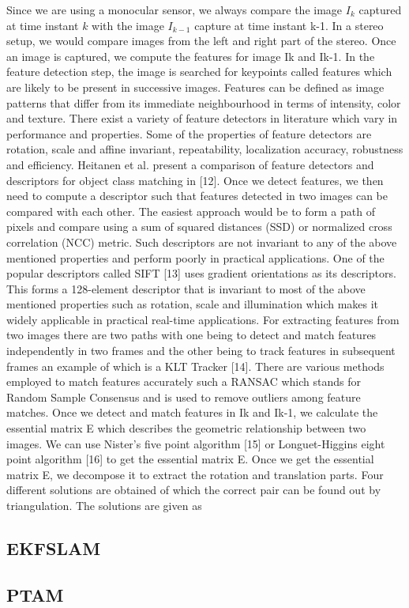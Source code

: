 Since we are using a monocular sensor, we always compare the image $I_k$ captured at time instant $k$ with the image $I_{k-1}$ capture at time instant k-1. In a stereo setup, we would compare images from the left and right part of the stereo. Once an image is captured, we compute the features for image Ik and Ik-1. In the feature detection step, the image is searched for keypoints called features  which are likely to be present in successive images. Features can be defined as image patterns that differ from its immediate neighbourhood in terms of intensity, color and texture. There exist a variety of feature detectors in literature which vary in performance and properties. Some of the properties of feature detectors are rotation, scale and affine invariant, repeatability, localization accuracy, robustness and efficiency.  Heitanen et al. present a comparison of feature detectors and descriptors for object class matching in [12]. Once we detect features, we then need to compute a descriptor such that features detected in two images can be compared with each other. The easiest approach would be to form a path of pixels and compare using a sum of squared distances (SSD) or normalized cross correlation (NCC) metric. Such descriptors are not invariant to any of the above mentioned properties and perform poorly in practical applications. One of the popular descriptors called SIFT [13] uses gradient orientations as its descriptors. This forms a 128-element descriptor that is invariant to most of the above mentioned properties such as rotation, scale and illumination which makes it widely applicable in practical real-time applications. For extracting features from two images there are two paths with one being to detect and match features independently in two frames and the other being to track features in subsequent frames an example of which is a KLT Tracker [14]. There are various methods employed to match features accurately such a RANSAC which stands for Random Sample Consensus and is used to remove outliers among feature matches. Once we detect and match features in Ik and Ik-1, we calculate the essential matrix E which describes the geometric relationship between two images. We can use Nister’s five point algorithm [15] or Longuet-Higgins eight point algorithm [16] to get the essential matrix E. Once we get the essential matrix E, we decompose it to extract the rotation and translation parts. Four different solutions are obtained of which the correct pair can be found out by triangulation. The solutions are given as

\subsection{EKFSLAM}

\subsection{PTAM}

